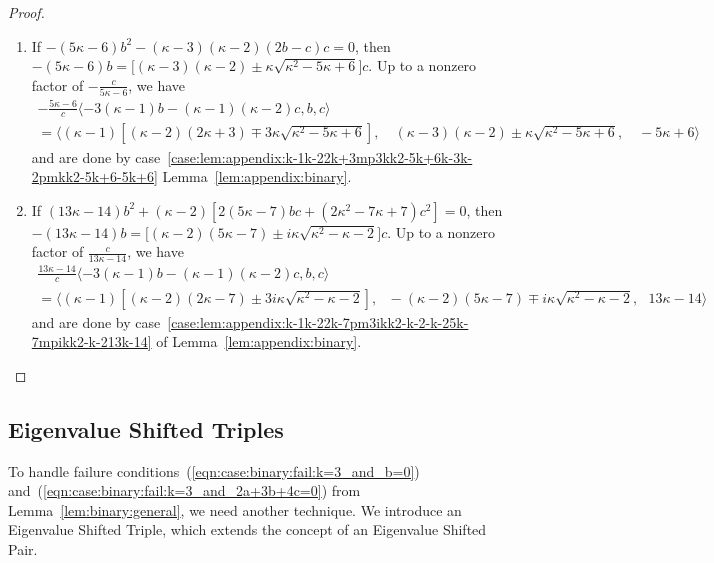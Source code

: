 \documentclass[11pt]{article}
\begin{document}
\begin{proof}
\begin{enumerate}
  \item If $-(5 \kappa - 6) b^2 - (\kappa - 3) (\kappa - 2) (2 b - c) c = 0$,
  then $-(5 \kappa - 6) b = \big[(\kappa - 3) (\kappa - 2) \pm \kappa \sqrt{\kappa^2 - 5 \kappa + 6}\big] c$.
  Up to a nonzero factor of $-\frac{c}{5 \kappa - 6}$,
  we have
  \begin{multline*}
   -\frac{5 \kappa - 6}{c}
   \langle -3 (\kappa - 1) b - (\kappa - 1) (\kappa - 2) c, b, c \rangle\\
   =
   \langle
    (\kappa - 1) \left[(\kappa - 2) (2 \kappa + 3) \mp 3 \kappa \sqrt{\kappa^2 - 5 \kappa + 6}\right],
    \quad
    (\kappa - 3) (\kappa - 2) \pm \kappa \sqrt{\kappa^2 - 5 \kappa + 6},
    \quad
    -5 \kappa + 6
   \rangle
  \end{multline*}
  and are done by case~\ref{case:lem:appendix:k-1k-22k+3mp3kk2-5k+6k-3k-2pmkk2-5k+6-5k+6} Lemma~\ref{lem:appendix:binary}.
  
  \item If $(13 \kappa - 14) b^2 + (\kappa - 2) [2 (5 \kappa - 7) b c + (2 \kappa^2 - 7 \kappa + 7) c^2] = 0$,
  then $-(13 \kappa - 14) b = \big[(\kappa - 2) (5 \kappa - 7) \pm i \kappa \sqrt{\kappa^2 - \kappa - 2}\big] c$.
  Up to a nonzero factor of $\frac{c}{13 \kappa - 14}$,
  we have
  \begin{multline*}
   \frac{13 \kappa - 14}{c}
   \langle -3 (\kappa - 1) b - (\kappa - 1) (\kappa - 2) c, b, c \rangle\\
   =
   \langle
    (\kappa - 1) \left[(\kappa - 2) (2 \kappa - 7) \pm 3 i \kappa \sqrt{\kappa^2 - \kappa - 2}\right],
    ~~~
    -(\kappa - 2) (5 \kappa - 7) \mp i \kappa \sqrt{\kappa^2 - \kappa - 2},
    ~~~
    13 \kappa - 14
   \rangle
  \end{multline*}
  and are done by case~\ref{case:lem:appendix:k-1k-22k-7pm3ikk2-k-2-k-25k-7mpikk2-k-213k-14} of Lemma~\ref{lem:appendix:binary}.
  \qedhere
 \end{enumerate}
\end{proof}

\subsection{Eigenvalue Shifted Triples} \label{subsec:binary:EST}

To handle failure conditions~(\ref{eqn:case:binary:fail:k=3_and_b=0}) and~(\ref{eqn:case:binary:fail:k=3_and_2a+3b+4c=0}) from Lemma~\ref{lem:binary:general},
we need another technique.
We introduce an Eigenvalue Shifted Triple,
which extends the concept of an Eigenvalue Shifted Pair.
\end{document}
